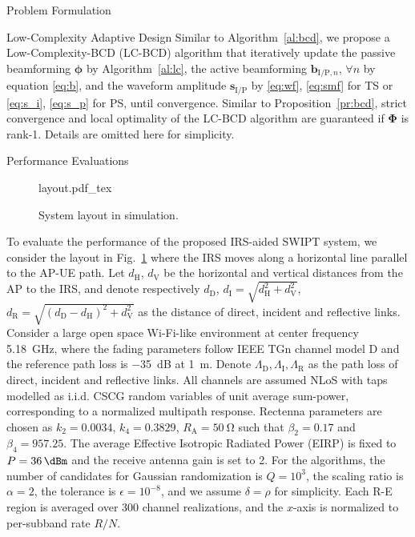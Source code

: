 \documentclass[journal]{IEEEtran}
\begin{document}
\begin{section}{Problem Formulation}
\begin{subsection}{Low-Complexity Adaptive Design}
			Similar to Algorithm~\ref{al:bcd}, we propose a Low-Complexity-BCD (LC-BCD) algorithm that iteratively update the passive beamforming $\boldsymbol{\phi}$ by Algorithm~\ref{al:lc}, the active beamforming $\boldsymbol{b}_{\mathrm{I/P},n}$, $\forall n$ by equation \eqref{eq:b}, and the waveform amplitude $\boldsymbol{s}_{\mathrm{I/P}}$ by \eqref{eq:wf}, \eqref{eq:smf} for TS or \eqref{eq:s_i}, \eqref{eq:s_p} for PS, until convergence. Similar to Proposition~\ref{pr:bcd}, strict convergence and local optimality of the LC-BCD algorithm are guaranteed if $\boldsymbol{\Phi}$ is rank-\num{1}. Details are omitted here for simplicity.
		\end{subsection}
	\end{section}


	\begin{section}{Performance Evaluations}\label{se:performance_evaluation}
		\begin{figure}[!t]
			\centering
			\def\svgwidth{0.9\columnwidth}
			{layout.pdf_tex}
			\caption{System layout in simulation.}
			\label{fi:layout}
		\end{figure}
		To evaluate the performance of the proposed IRS-aided SWIPT system, we consider the layout in Fig.~\ref{fi:layout} where the IRS moves along a horizontal line parallel to the AP-UE path. Let $d_{\mathrm{H}}$, $d_{\mathrm{V}}$ be the horizontal and vertical distances from the AP to the IRS, and denote respectively $d_{\mathrm{D}}$, $d_{\mathrm{I}}=\sqrt{d_{\mathrm{H}}^2+d_{\mathrm{V}}^2}$, $d_{\mathrm{R}}=\sqrt{(d_{\mathrm{D}}-d_{\mathrm{H}})^2+d_{\mathrm{V}}^2}$ as the distance of direct, incident and reflective links. Consider a large open space Wi-Fi-like environment at center frequency \SI{5.18}{\GHz}, where the fading parameters follow IEEE TGn channel model D \cite{Erceg2004} and the reference path loss is \SI{-35}{\dB} at \SI{1}{\meter}. Denote $\Lambda_{\mathrm{D}},\Lambda_{\mathrm{I}},\Lambda_{\mathrm{R}}$ as the path loss of direct, incident and reflective links. All channels are assumed NLoS with taps modelled as i.i.d. CSCG random variables of unit average sum-power, corresponding to a normalized multipath response. Rectenna parameters are chosen as $k_2=0.0034$, $k_4=0.3829$, $R_{\mathrm{A}}=\SI{50}{\ohm}$ such that $\beta_2=0.17$ and $\beta_4=957.25$. The average Effective Isotropic Radiated Power (EIRP) is fixed to $P=\SI{36}{\dBm}$ and the receive antenna gain is set to \SI{2}{\dBi}. For the algorithms, the number of candidates for Gaussian randomization is $Q=10^{3}$, the scaling ratio is $\alpha=2$, the tolerance is $\epsilon=10^{-8}$, and we assume $\delta=\rho$ for simplicity. Each R-E region is averaged over \num{300} channel realizations, and the $x$-axis is normalized to per-subband rate $R/N$.


\end{section}
\end{document}
